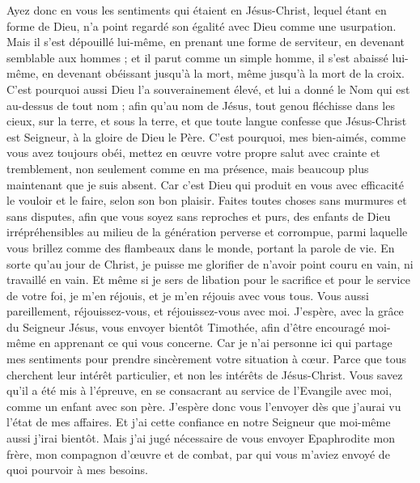 \begin{multicols}{2}
Ayez donc en vous les sentiments qui étaient en Jésus-Christ,
lequel étant en forme de Dieu, n'a point regardé son égalité avec Dieu comme une usurpation.
Mais il s’est dépouillé lui-même, en prenant une forme de serviteur, en devenant semblable aux hommes ; et il parut comme un simple homme,
il s'est abaissé lui-même, en devenant obéissant jusqu’à la mort, même jusqu’à la mort de la croix.
C'est pourquoi aussi Dieu l'a souverainement élevé, et lui a donné le Nom qui est au-dessus de tout nom ;
afin qu'au nom de Jésus, tout genou fléchisse dans les cieux, sur la terre, et sous la terre,
et que toute langue confesse que Jésus-Christ est Seigneur, à la gloire de Dieu le Père.
C'est pourquoi, mes bien-aimés, comme vous avez toujours obéi, mettez en œuvre votre propre salut avec crainte et tremblement, non seulement comme en ma présence, mais beaucoup plus maintenant que je suis absent.
Car c'est Dieu qui produit en vous avec efficacité le vouloir et le faire, selon son bon plaisir.
Faites toutes choses sans murmures et sans disputes,
afin que vous soyez sans reproches et purs, des enfants de Dieu irrépréhensibles au milieu de la génération perverse et corrompue, parmi laquelle vous brillez comme des flambeaux dans le monde, portant la parole de vie.
En sorte qu’au jour de Christ, je puisse me glorifier de n'avoir point couru en vain, ni travaillé en vain.
Et même si je sers de libation pour le sacrifice et pour le service de votre foi, je m’en réjouis, et je m'en réjouis avec vous tous.
Vous aussi pareillement, réjouissez-vous, et réjouissez-vous avec moi.
J'espère, avec la grâce du Seigneur Jésus, vous envoyer bientôt Timothée, afin d’être encouragé moi-même en apprenant ce qui vous concerne.
Car je n'ai personne ici qui partage mes sentiments pour prendre sincèrement votre situation à cœur.
Parce que tous cherchent leur intérêt particulier, et non les intérêts de Jésus-Christ.
Vous savez qu’il a été mis à l’épreuve, en se consacrant au service de l’Evangile avec moi, comme un enfant avec son père.
J'espère donc vous l'envoyer dès que j'aurai vu l’état de mes affaires.
Et j’ai cette confiance en notre Seigneur que moi-même aussi j’irai bientôt.
Mais j'ai jugé nécessaire de vous envoyer Epaphrodite mon frère, mon compagnon d’œuvre et de combat, par qui vous m’aviez envoyé de quoi pourvoir à mes besoins.

\end{multicols}
